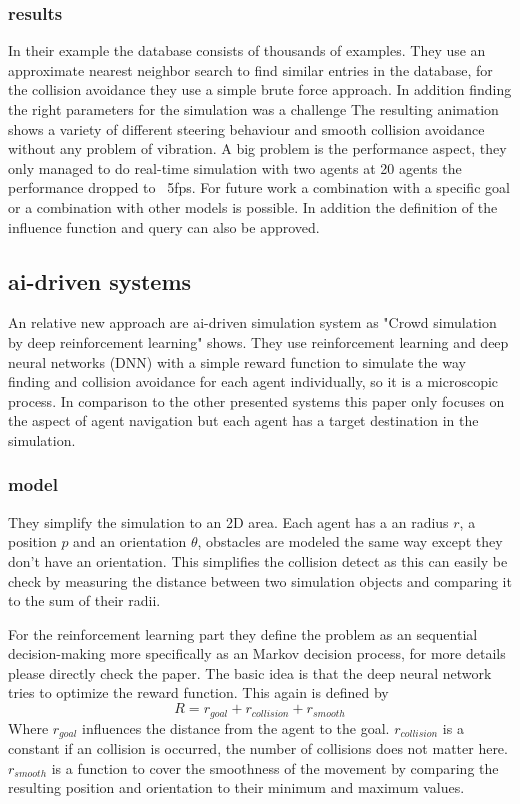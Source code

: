 \documentclass[sigconf]{acmart}
\begin{document}
\subsubsection{results}
In their example the database consists of thousands of examples. They use an approximate nearest neighbor search to find similar entries in the database, for the collision avoidance they use a simple brute force approach. In addition finding the right parameters for the simulation was a challenge
The resulting animation shows a variety of different steering behaviour and smooth collision avoidance without any problem of vibration.  
A big problem is the performance aspect, they only managed to do real-time simulation with two agents at 20 agents the performance dropped to ~5fps. 
For future work a combination with a specific goal or a combination with other models is possible. In addition the definition of the influence function and query can also be approved.

\subsection{ai-driven systems}
An relative new approach are ai-driven simulation system as "Crowd simulation by deep reinforcement learning" \cite{lee_crowd_2018} shows. They use reinforcement learning and deep neural networks (DNN) with a simple reward function to simulate the way finding and collision avoidance for each agent individually, so it is a microscopic process. In comparison to the other presented systems this paper only focuses on the aspect of agent navigation but each agent has a target destination in the simulation.

\subsubsection{model}
They simplify the simulation to an 2D area. Each agent has a an radius $r$, a position $p$ and an orientation $\theta$, obstacles are modeled the same way except they don't have an orientation. 
This simplifies the collision detect as this can easily be check by measuring the distance between two simulation objects and comparing it to the sum of their radii.

For the reinforcement learning part they define the problem as an sequential decision-making more specifically as an Markov decision process, for more details please directly check the paper. The basic idea is that the deep neural network tries to optimize the reward function. This again is defined by 
\begin{equation}
R = r_{goal} + r_{collision} + r_{smooth}
\end{equation}
Where $r_{goal}$ influences the distance from the agent to the goal. $r_{collision}$ is a constant if an collision is occurred, the number of collisions does not matter here. $r_{smooth}$ is a function to cover the smoothness of the movement by comparing the resulting position and orientation to their minimum and maximum values.  
\end{document}
